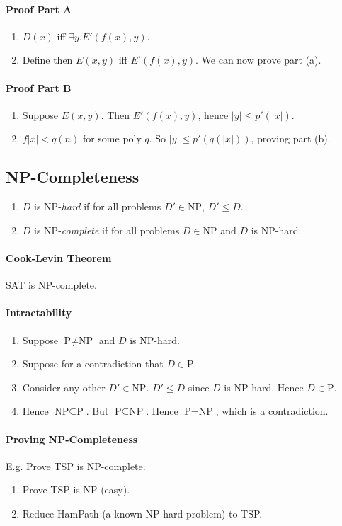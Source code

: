 \documentclass[twocolumn,english]{article}
\begin{document}
\paragraph{Proof Part A}
\begin{enumerate}
\item $D\left(x\right)$ iff $\exists y.E'\left(f\left(x\right),y\right)$.
\item Define then $E\left(x,y\right)$ iff $E'\left(f\left(x\right),y\right)$.
We can now prove part (a).
\end{enumerate}

\paragraph{Proof Part B}
\begin{enumerate}
\item Suppose $E\left(x,y\right)$. Then $E'\left(f\left(x\right),y\right)$,
hence $\left|y\right|\leq p'\left(\left|x\right|\right)$.
\item $f\left|x\right|<q\left(n\right)$ for some poly $q$. So $\left|y\right|\leq p'\left(q\left(\left|x\right|\right)\right)$,
proving part (b).
\end{enumerate}

\subsection{NP-Completeness}
\begin{enumerate}
\item $D$ is NP-\emph{hard} if for all problems $D'\in\mbox{NP}$, $D'\leq D$.
\item $D$ is NP-\emph{complete} if for all problems $D\in\mbox{NP}$ and
$D$ is NP-hard.
\end{enumerate}

\paragraph{Cook-Levin Theorem}

SAT is NP-complete.


\paragraph{Intractability}
\begin{enumerate}
\item Suppose $\mbox{P}\neq\mbox{NP}$ and $D$ is NP-hard.
\item Suppose for a contradiction that $D\in\mbox{P}$.
\item Consider any other $D'\in\mbox{NP}$. $D'\leq D$ since $D$ is NP-hard.
Hence $D\in\mbox{P}$.
\item Hence $\mbox{NP}\subseteq\mbox{P}$. But $\mbox{P}\subseteq\mbox{NP}$.
Hence $\mbox{P}=\mbox{NP}$, which is a contradiction.
\end{enumerate}

\paragraph{Proving NP-Completeness}

E.g. Prove TSP is NP-complete.
\begin{enumerate}
\item Prove TSP is NP (easy).
\item Reduce HamPath (a known NP-hard problem) to TSP.\end{enumerate}
\end{document}

